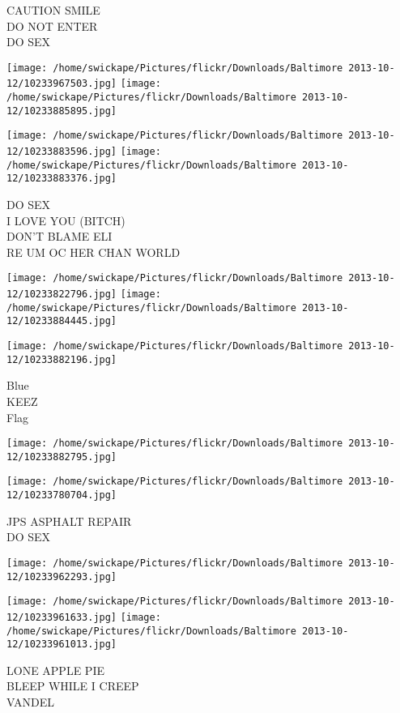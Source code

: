 \documentclass[10pt,letterpaper]{article}
\begin{document}
CAUTION SMILE\\
DO NOT ENTER\\
DO SEX
\pagebreak

\texttt{[image: /home/swickape/Pictures/flickr/Downloads/Baltimore 2013-10-12/10233967503.jpg]}
\texttt{[image: /home/swickape/Pictures/flickr/Downloads/Baltimore 2013-10-12/10233885895.jpg]}

\texttt{[image: /home/swickape/Pictures/flickr/Downloads/Baltimore 2013-10-12/10233883596.jpg]}
\texttt{[image: /home/swickape/Pictures/flickr/Downloads/Baltimore 2013-10-12/10233883376.jpg]}

DO SEX\\
I LOVE YOU (BITCH)\\
DON'T BLAME ELI\\
RE UM OC HER CHAN WORLD
\pagebreak

\texttt{[image: /home/swickape/Pictures/flickr/Downloads/Baltimore 2013-10-12/10233822796.jpg]}
\texttt{[image: /home/swickape/Pictures/flickr/Downloads/Baltimore 2013-10-12/10233884445.jpg]}

\texttt{[image: /home/swickape/Pictures/flickr/Downloads/Baltimore 2013-10-12/10233882196.jpg]}

Blue\\
KEEZ\\
Flag
\pagebreak

\texttt{[image: /home/swickape/Pictures/flickr/Downloads/Baltimore 2013-10-12/10233882795.jpg]}

\vspace{0.25in}
\texttt{[image: /home/swickape/Pictures/flickr/Downloads/Baltimore 2013-10-12/10233780704.jpg]}

JPS ASPHALT REPAIR\\
DO SEX
\pagebreak

\texttt{[image: /home/swickape/Pictures/flickr/Downloads/Baltimore 2013-10-12/10233962293.jpg]}

\vspace{0.25in}
\texttt{[image: /home/swickape/Pictures/flickr/Downloads/Baltimore 2013-10-12/10233961633.jpg]}
\texttt{[image: /home/swickape/Pictures/flickr/Downloads/Baltimore 2013-10-12/10233961013.jpg]}

LONE APPLE PIE\\
BLEEP WHILE I CREEP\\
VANDEL
\pagebreak
\end{document}
